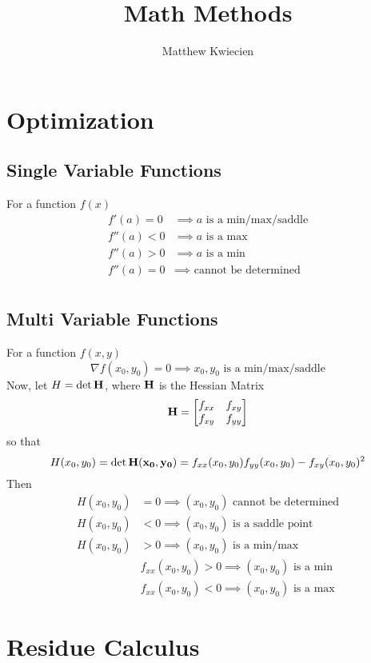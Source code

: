 \documentclass{article}
\title{Math Methods}
\author{Matthew Kwiecien}
\begin{document}
\maketitle
\section{Optimization}
\subsection{Single Variable Functions}
For a function $f(x)$
\begin{align*}
	f'(a) = 0  & \implies  a \text{ is a min/max/saddle} \\
	f''(a) < 0 & \implies a \text{ is a max}             \\
	f''(a) > 0 & \implies  a \text{ is a min}            \\
	f''(a) = 0 & \implies  \text{ cannot be determined}  \\
\end{align*}
\subsection{Multi Variable Functions}
For a function $f(x,y)$
$$
\nabla f(x_0, y_0) = 0 \implies x_0, y_0 \text{ is a min/max/saddle}
$$
Now, let $H = \det \vb{H}$, where $\vb{H}$ is the Hessian Matrix
$$
\vb{H} = 
\begin{bmatrix}
	f_{xx} & f_{xy} \\
	f_{xy} & f_{yy} 
\end{bmatrix}
$$
so that
$$
H(x_0, y_0) = \det \vb{H(x_0, y_0)} = f_{xx}(x_0, y_0)f_{yy}(x_0, y_0) - f_{xy}(x_0, y_0)^2
$$
Then
\begin{align*}
	H(x_0, y_0) & = 0 \implies  (x_0, y_0) \text{ cannot be determined}      \\
	H(x_0, y_0) & < 0 \implies (x_0, y_0) \text{ is a saddle point}          \\
	H(x_0, y_0) & > 0 \implies  (x_0, y_0) \text{ is a min/max}              \\
	            & f_{xx}(x_0, y_0) > 0  \implies (x_0, y_0) \text{ is a min} \\
	            & f_{xx}(x_0, y_0) < 0  \implies (x_0, y_0) \text{ is a max} 
\end{align*}

\section{Residue Calculus}
\end{document}
